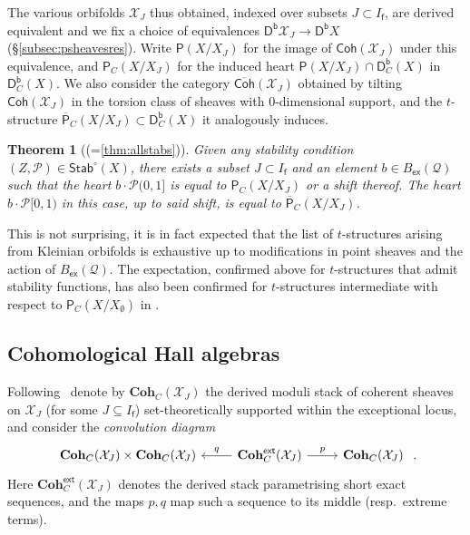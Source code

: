 \documentclass[reqno,a4paper]{amsart}
\newcommand{\calP}{\mathcal{P}}
\newcommand{\calX}{\mathcal{X}}
\newcommand{\sff}{\mathsf{f}}
\newcommand{\catP}{\mathsf{P}}
\newcommand{\catPC}{\mathsf{P}_{C}}
\newcommand{\barcatPC}{\overline{\mathsf{P}}_{C}}
\newcommand{\Stab}{\mathsf{Stab}}
\newcommand{\catCoh}{\mathsf{Coh}}
\newcommand{\barcatCoh}{\overline{\mathsf{Coh}}}
\newcommand{\catDb}{\mathsf{D}^\mathsf{b}}
\newcommand{\catDbC}{\mathsf{D}^\mathsf{b}_C}
\newcommand{\dstackCoh}{\mathbf{Coh}}
\newcommand{\qv}{\mathcal{Q}}
\newcommand{\sfex}{\mathsf{ex}}
\newcommand{\rsv}{X}
\newcommand{\ssv}{X_\emptyset}
\newcommand{\psv}{X_J}
\theoremstyle{basic-theorem}
\numberwithin{equation}{section}
\newtheorem{theoremintroduction}{Theorem}
\begin{document}
The various orbifolds $\calX_J$ thus obtained, indexed over subsets $J\subset I_\sff$, are derived equivalent and we fix a choice of equivalences $\catDb\calX_J\to \catDb X$ (\S\ref{subsec:psheavesres}). Write $\catP(\rsv/\psv)$ for the image of $\catCoh(\calX_J)$ under this equivalence, and $\catPC(\rsv/\psv)$ for the induced heart $\catP(\rsv/\psv)\cap \catDbC (\rsv)$ in $\catDbC(\rsv)$. We also consider the category $\barcatCoh(\calX_J)$ obtained by tilting $\catCoh(\calX_J)$ in the torsion class of sheaves with $0$-dimensional support, and the $t$-structure $\barcatPC(\rsv/\psv)\subset \catDbC(X)$ it analogously induces.

\begin{theoremintroduction}[{(=\ref{thm:allstabs})}] \label{thm:A} 
    Given any stability condition $(Z,\calP)\in \Stab^\circ(\rsv)$, there exists a subset $J\subset I_\sff$ and an element $b\in B_\sfex(\qv)$ such that the heart $b\cdot \calP(0,1]$ is equal to $\catPC(\rsv/\psv)$ or a shift
    thereof. The heart $b\cdot \calP[0,1)$ in this case, up to said shift, is equal to $\barcatPC(\rsv/\psv)$.
\end{theoremintroduction}                                                           

This is not surprising, it is in fact expected that the list of $t$-structures
arising from Kleinian orbifolds is exhaustive up to modifications in point
sheaves and the action of $B_\sfex(\qv)$. The expectation, confirmed above for
$t$-structures that admit stability functions, has also been confirmed for
$t$-structures intermediate with respect to $\catPC(\rsv/\ssv)$ in
\cite{Shimpi_Torsion_pairs}.

\subsection*{Cohomological Hall algebras} 

Following~\cite{Porta_Sala_Hall, DPSSV-1} denote by $\dstackCoh_C(\calX_J)$ the derived moduli stack of coherent sheaves on $\calX_J$ (for some $J\subseteq I_\sff$) set-theoretically supported within the exceptional locus, and consider the \textit{convolution diagram}
\begin{align}
	\begin{tikzcd}[ampersand replacement=\&]
        \dstackCoh_C(\calX_J) \times \dstackCoh_C(\calX_J) \&
        \dstackCoh^{\mathsf{ext}}_C(\calX_J) \ar{r}{p} \ar{l}[swap]{q}\&
        \dstackCoh_C(\calX_J) 
	\end{tikzcd}\ .
\end{align}
Here $\dstackCoh^{\mathsf{ext}}_C(\calX_J)$ denotes the derived stack parametrising short exact sequences, and the maps $p,q$ map such a sequence to its middle (resp.\ extreme terms). 
\end{document}
